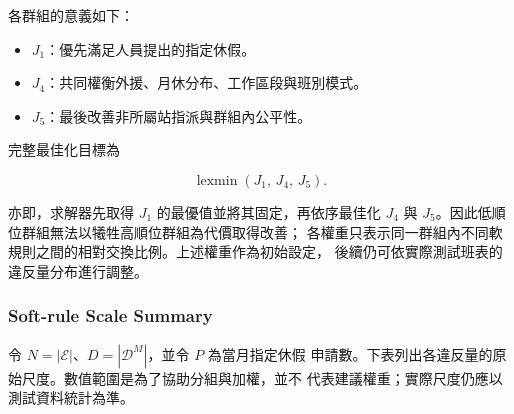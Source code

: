 \documentclass[12pt]{article}
\begin{document}
各群組的意義如下：

\begin{itemize}
  \item \(J_1\)：優先滿足人員提出的指定休假。
  \item \(J_4\)：共同權衡外援、月休分布、工作區段與班別模式。
  \item \(J_5\)：最後改善非所屬站指派與群組內公平性。
\end{itemize}

完整最佳化目標為

\[
  \operatorname{lexmin}
  \left(
    J_1,\,J_4,\,J_5
  \right).
\]

亦即，求解器先取得 \(J_1\) 的最優值並將其固定，再依序最佳化
\(J_4\) 與 \(J_5\)。因此低順位群組無法以犧牲高順位群組為代價取得改善；
各權重只表示同一群組內不同軟規則之間的相對交換比例。上述權重作為初始設定，
後續仍可依實際測試班表的違反量分布進行調整。

\subsubsection{Soft-rule Scale Summary}

令 \(N=|\mathcal{E}|\)、\(D=|\mathcal{D}^{M}|\)，並令 \(P\) 為當月指定休假
申請數。下表列出各違反量的原始尺度。數值範圍是為了協助分組與加權，並不
代表建議權重；實際尺度仍應以測試資料統計為準。
\end{document}
